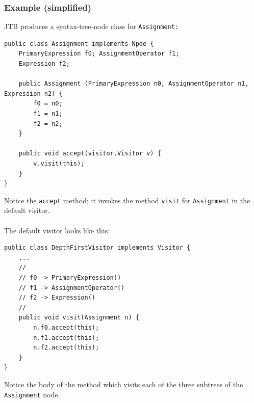 \documentclass[10pt]{article}
\begin{document}
\subsubsection*{Example (simplified)}
JTB produces a syntax-tree-node class for \texttt{Assignment:}
\begin{verbatim}
public class Assignment implements Npde {
    PrimaryExpression f0; AssignmentOperator f1;
    Expression f2;

    public Assignment (PrimaryExpression n0, AssignmentOperator n1, Expression n2) {
        f0 = n0;
        f1 = n1;
        f2 = n2;
    }

    public void accept(visitor.Visitor v) {
        v.visit(this);
    }
}
\end{verbatim}
Notice the \texttt{accept} method; it invokes the method \texttt{visit} for \texttt{Assignment} in the default visitor.\\\\
The default visitor looks like this:
\begin{verbatim}
public class DepthFirstVisitor implements Visitor {
    ...
    //
    // f0 -> PrimaryExpression()
    // f1 -> AssignmentOperator()
    // f2 -> Expression()
    //
    public void visit(Assignment n) {
        n.f0.accept(this);
        n.f1.accept(this);
        n.f2.accept(this);
    }
}
\end{verbatim}
Notice the body of the method which visits each of the three subtrees of the \texttt{Assignment} node.
\end{document}
